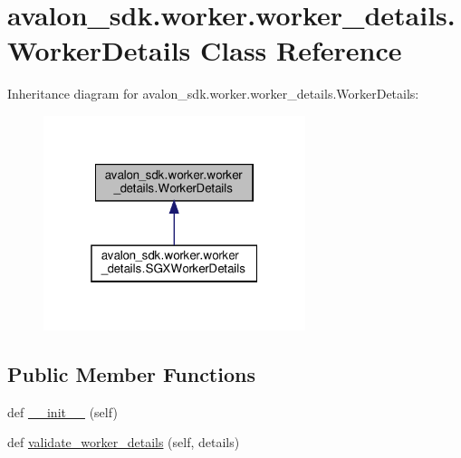 \hypertarget{classavalon__sdk_1_1worker_1_1worker__details_1_1WorkerDetails}{}\section{avalon\+\_\+sdk.\+worker.\+worker\+\_\+details.\+Worker\+Details Class Reference}
\label{classavalon__sdk_1_1worker_1_1worker__details_1_1WorkerDetails}


Inheritance diagram for avalon\+\_\+sdk.\+worker.\+worker\+\_\+details.\+Worker\+Details\+:
\nopagebreak
\begin{figure}[H]
\begin{center}
\leavevmode
\includegraphics[width=217pt]{classavalon__sdk_1_1worker_1_1worker__details_1_1WorkerDetails__inherit__graph}
\end{center}
\end{figure}
\subsection*{Public Member Functions}
\begin{DoxyCompactItemize}
\item 
def \hyperlink{classavalon__sdk_1_1worker_1_1worker__details_1_1WorkerDetails_a027a0670f35331c0d8a3463dca5dc5b3}{\+\_\+\+\_\+init\+\_\+\+\_\+} (self)
\item 
def \hyperlink{classavalon__sdk_1_1worker_1_1worker__details_1_1WorkerDetails_a7c4914b92c2fcdcac1e448cb42a76a82}{validate\+\_\+worker\+\_\+details} (self, details)
\end{DoxyCompactItemize}
